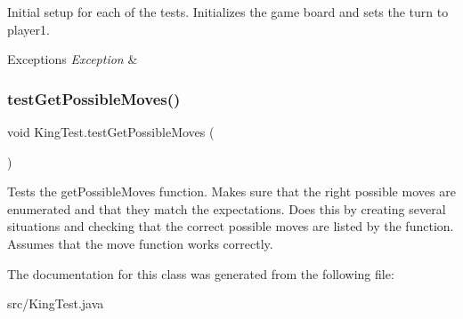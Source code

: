 Initial setup for each of the tests. Initializes the game board and sets the turn to player1. 
\begin{DoxyExceptions}{Exceptions}
{\em Exception} & \\
\hline
\end{DoxyExceptions}
\mbox{\label{class_king_test_af758164095ca29c3ce8ff7aea3291f2a}} 
\subsubsection{\texorpdfstring{test\+Get\+Possible\+Moves()}{testGetPossibleMoves()}}
{\footnotesize\ttfamily void King\+Test.\+test\+Get\+Possible\+Moves (\begin{DoxyParamCaption}{ }\end{DoxyParamCaption})}

Tests the get\+Possible\+Moves function. Makes sure that the right possible moves are enumerated and that they match the expectations. Does this by creating several situations and checking that the correct possible moves are listed by the function. Assumes that the move function works correctly. 

The documentation for this class was generated from the following file\+:\begin{DoxyCompactItemize}
\item 
src/King\+Test.\+java\end{DoxyCompactItemize}
